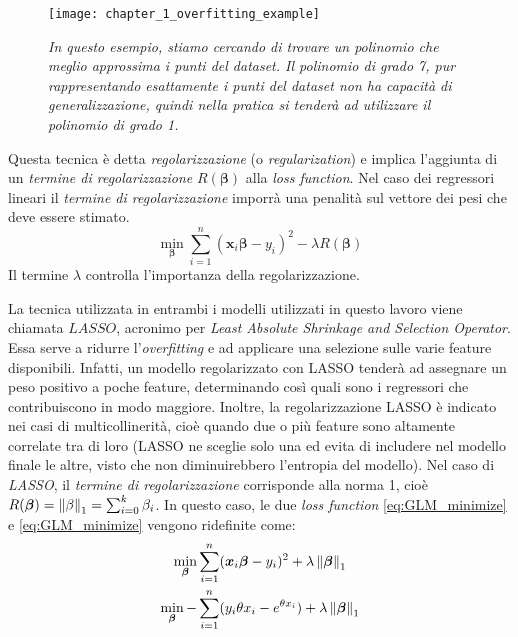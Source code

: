 \begin{figure}[ht]
\centering
\texttt{[image: chapter\_1\_overfitting\_example]}
\caption{\textit{In questo esempio, stiamo cercando di trovare un polinomio che meglio approssima i punti del dataset. Il polinomio di grado 7, pur rappresentando esattamente i punti del dataset non ha capacità di generalizzazione, quindi nella pratica si tenderà ad utilizzare il polinomio di grado 1.}}
\label{fig:ch_1_overfitting}
\end{figure}

Questa tecnica è detta \textit{regolarizzazione} (o \textit{regularization}) e implica l'aggiunta di un \textit{termine di 
regolarizzazione} $R(\bm{\beta})$ alla \textit{loss function}. Nel caso dei regressori lineari il \textit{termine di 
regolarizzazione} imporrà una penalità sul vettore dei pesi che deve essere stimato.
\begin{equation}
\min_{\bm{\beta}} \sum_{i=1}^{n} (\bm{x}_i\bm{\beta} - y_i)^2 - \lambda R(\bm{\beta})
\end{equation}
Il termine $\lambda$ controlla l'importanza della regolarizzazione.
\bigskip

La tecnica utilizzata in entrambi i modelli utilizzati in questo lavoro viene chiamata $\textit{LASSO}$, acronimo per 
\textit{Least Absolute Shrinkage and Selection Operator}. Essa serve a ridurre l'\textit{overfitting} e ad applicare 
una selezione sulle varie feature disponibili. Infatti, un modello regolarizzato con LASSO tenderà ad assegnare un peso 
positivo a poche feature, determinando così quali sono i regressori che contribuiscono in modo maggiore. Inoltre, la 
regolarizzazione LASSO è indicato nei casi di multicollinerità, cioè quando due o più feature sono altamente correlate tra di 
loro (LASSO ne sceglie solo una ed evita di includere nel modello finale le altre, visto che non diminuirebbero l'entropia 
del modello). Nel caso di \textit{LASSO}, il \textit{termine di regolarizzazione} corrisponde alla norma 1, cioè 
$R(\bm{\beta}) = \left\lVert\bf{\beta}\right\rVert_1 = \sum_{i=0}^k \beta_i$. 
In questo caso, le due \textit{loss function} \eqref{eq:GLM_minimize} e 
\eqref{eq:GLM_minimize} vengono ridefinite come:
\begin{gather}
\min_{\bm{\beta}} \sum_{i=1}^{n} (\bm{x}_i\bm{\beta} - y_i)^2 + \lambda\left\lVert\bm{\beta}\right\rVert_1 \label{eq:OLS_LASSO} \\
\min_{\bm{\beta}} -\sum_{i=1}^n (y_i\theta x_i - e^{\theta x_i} )  + \lambda\left\lVert\bm{\beta}\right\rVert_1 \label{eq:GLM_LASSO}
\end{gather}  

